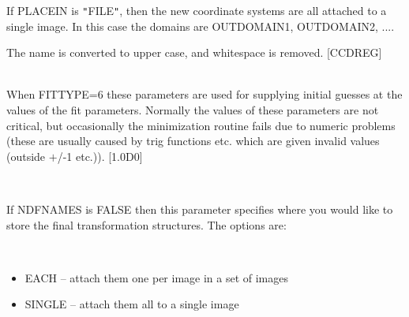 \documentclass[twoside,11pt]{article}
\renewcommand{\_}{\texttt{\symbol{95}}}
\newcommand{\sstsubsection}[1]{ \item[{#1}] \mbox{} \\}
\newcommand{\sstitemlist}[1]{
  \mbox{} \\
  \vspace{-3.5ex}
  \begin{itemize}
     #1
  \end{itemize}
}
\newcommand{\sstitem}{\item}
\newcommand{\sstsubsection}[1]{\item[{#1}]}
\newcommand{\sstitemlist}[1]{
      \begin{itemize}
         #1
      \end{itemize}
      \\
   }
\newcommand{\sstitem}{\item}
\begin{document}
{{{         If PLACEIN is {\tt "}FILE{\tt "}, then the new coordinate systems are all
         attached to a single image.  In this case the  domains are
         OUTDOMAIN\_1, OUTDOMAIN\_2, ....

         The name is converted to upper case, and whitespace is removed.
         [CCD\_REG]
      }
      \sstsubsection{
         PA-PZ = LITERAL (Read)
      } {
         When FITTYPE=6 these parameters are used for supplying initial
         guesses at the values of the fit parameters. Normally the
         values of these parameters are not critical, but occasionally
         the minimization routine fails due to numeric problems (these
         are usually caused by trig functions etc. which are given
         invalid values (outside $+$/-1 etc.)).
         [1.0D0]
      }
      \sstsubsection{
         PLACEIN = LITERAL (Read)
      } {
         If NDFNAMES is FALSE then this parameter specifies where
         you would like to store the final transformation structures.
         The options are:
         \sstitemlist{

            \sstitem
               EACH    -- attach them one per image in a set of images

            \sstitem
               SINGLE  -- attach them all to a single image

}}}}
\end{document}
